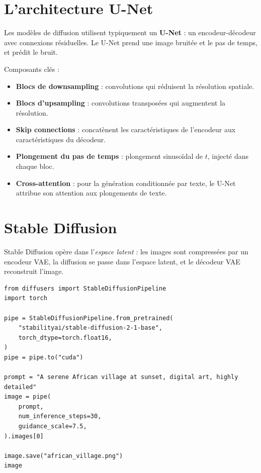 \section{L'architecture U-Net}

Les mod\`eles de diffusion utilisent typiquement un \textbf{U-Net} : un encodeur-d\'ecodeur avec connexions r\'esiduelles. Le U-Net prend une image bruit\'ee et le pas de temps, et pr\'edit le bruit.

Composants cl\'es :
\begin{itemize}
  \item \textbf{Blocs de downsampling} : convolutions qui r\'eduisent la r\'esolution spatiale.
  \item \textbf{Blocs d'upsampling} : convolutions transpos\'ees qui augmentent la r\'esolution.
  \item \textbf{Skip connections} : concat\`enent les caract\'eristiques de l'encodeur aux caract\'eristiques du d\'ecodeur.
  \item \textbf{Plongement du pas de temps} : plongement sinuso\"idal de $t$, inject\'e dans chaque bloc.
  \item \textbf{Cross-attention} : pour la g\'en\'eration conditionn\'ee par texte, le U-Net attribue son attention aux plongements de texte.
\end{itemize}

\section{Stable Diffusion}

Stable Diffusion op\`ere dans l'\emph{espace latent} : les images sont compress\'ees par un encodeur VAE, la diffusion se passe dans l'espace latent, et le d\'ecodeur VAE reconstruit l'image.

\begin{verbatim}
from diffusers import StableDiffusionPipeline
import torch

pipe = StableDiffusionPipeline.from_pretrained(
    "stabilityai/stable-diffusion-2-1-base",
    torch_dtype=torch.float16,
)
pipe = pipe.to("cuda")

prompt = "A serene African village at sunset, digital art, highly detailed"
image = pipe(
    prompt,
    num_inference_steps=30,
    guidance_scale=7.5,
).images[0]

image.save("african_village.png")
image
\end{verbatim}

